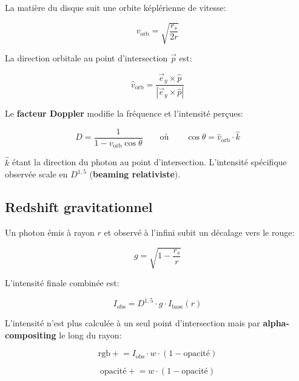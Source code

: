 \documentclass[12pt, a4paper]{article}
\begin{document}
La matière du disque suit une orbite képlérienne de vitesse:

\begin{equation}
    v_{\text{orb}} = \sqrt{\frac{r_s}{2r}}
\end{equation}

La direction orbitale au point d'intersection $\vec{p}$ est:

\begin{equation}
    \hat{v}_{\text{orb}} = \frac{\vec{e}_y \times \hat{p}}{|\vec{e}_y \times \hat{p}|}
\end{equation}

Le \textbf{facteur Doppler} modifie la fréquence et l'intensité perçues:

\begin{equation}
    D = \frac{1}{1 - v_{\text{orb}}\cos\theta}
    \qquad \text{où} \qquad
    \cos\theta = \hat{v}_{\text{orb}} \cdot \hat{k}
\end{equation}

$\hat{k}$ étant la direction du photon au point d'intersection.
L'intensité spécifique observée scale en $D^{1,5}$ (\textbf{beaming relativiste}).

\subsection{Redshift gravitationnel}

Un photon émis à rayon $r$ et observé à l'infini subit un décalage vers le rouge:

\begin{equation}
    g = \sqrt{1 - \frac{r_s}{r}}
\end{equation}

L'intensité finale combinée est:

\begin{equation}
    \boxed{I_{\text{obs}} = D^{1{,}5} \cdot g \cdot I_{\text{base}}(r)}
\end{equation}

L'intensité n'est plus calculée à un seul point d'intersection mais par \textbf{alpha-compositing} le long du rayon:

\begin{equation}
    \text{rgb} \mathrel{+}= I_{\text{obs}} \cdot w \cdot (1 - \text{opacité})
\end{equation}

\begin{equation}
    \text{opacité} \mathrel{+}= w \cdot (1 - \text{opacité})
\end{equation}
\end{document}
